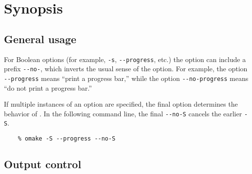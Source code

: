 %
\chapter{Synopsis}
\label{chapter:options}

     

%
\section{General usage}

For Boolean options (for example, \verb+-s+, \verb+--progress+, etc.) the option can include a
prefix \verb+--no-+, which inverts the usual sense of the option.  For example, the option
\verb+--progress+ means ``print a progress bar,''  while the option \verb+--no-progress+ means
``do not print a progress bar.''

If multiple instances of an option are specified, the final option determines the behavior of \OMake{}.
In the following command line, the final \verb+--no-S+ cancels the earlier \verb+-S+.

\begin{verbatim}
    % omake -S --progress --no-S
\end{verbatim}

\section{Output control}

